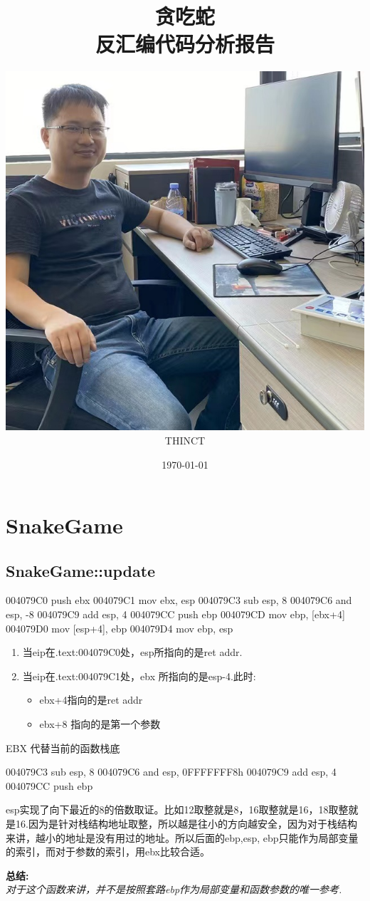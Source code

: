\documentclass[AutoFakeBold,AutoFakeSlant]{beamer}
\title{\textbf{贪吃蛇}\\反汇编代码分析报告}
\date{\today}
\author{\includegraphics[width=0.26\linewidth]{ShowMe}\\THINCT}
\begin{document}
	\maketitle
	
	\section{SnakeGame}
	\subsection{SnakeGame::update}
	
	\begin{frame}[fragile]
		\begin{x86asmcode}
004079C0  push  ebx
004079C1  mov   ebx, esp
004079C3  sub   esp, 8
004079C6  and   esp, -8
004079C9  add   esp, 4
004079CC  push  ebp
004079CD  mov   ebp, [ebx+4]
004079D0  mov   [esp+4], ebp
004079D4  mov   ebp, esp\end{x86asmcode}
		\begin{enumerate}
			\item 当eip在.text:004079C0处，esp所指向的是ret addr. 
			\item 当eip在.text:004079C1处，ebx 所指向的是esp-4.此时:
			\begin{itemize}
					\item ebx+4指向的是ret addr
					\item ebx+8 指向的是第一个参数
			\end{itemize}
		\end{enumerate}
	\end{frame}
	
	
	\begin{frame}[fragile]{EBX 代替当前的函数栈底}
        \begin{x86asmcode}
004079C3  sub   esp, 8
004079C6  and   esp, 0FFFFFFF8h 
004079C9  add   esp, 4
004079CC  push  ebp\end{x86asmcode} 
		esp实现了向下最近的8的倍数取证。比如12取整就是8，16取整就是16，18取整就是16.因为是针对栈结构地址取整，所以越是往小的方向越安全，因为对于栈结构来讲，越小的地址是没有用过的地址。所以后面的ebp,esp, ebp只能作为局部变量的索引，而对于参数的索引，用ebx比较合适。
		
		\textbf {总结:}\\
		\emph {对于这个函数来讲，并不是按照套路ebp作为局部变量和函数参数的唯一参考.} 
	\end{frame}
	
\end{document}

